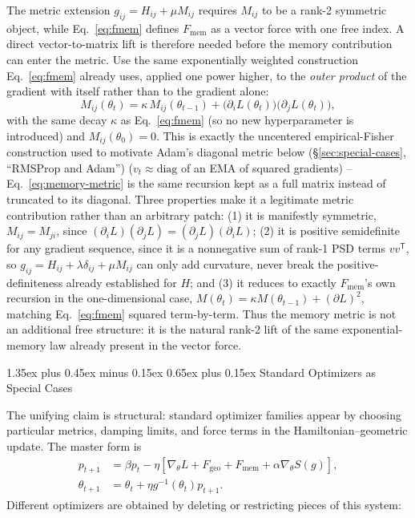 \documentclass[10pt,twocolumn]{article}
\makeatletter
\renewcommand\section{\@startsection{section}{1}{0pt}%
  {1.35ex plus 0.45ex minus 0.15ex}%
  {0.65ex plus 0.15ex}%
  {\large\bfseries}}
\makeatother
\begin{document}
The metric extension $g_{ij} = H_{ij} + \mu M_{ij}$ requires $M_{ij}$ to be a
rank-2 symmetric object, while Eq.~\eqref{eq:fmem} defines
$F_{\mathrm{mem}}$ as a vector force with one free index. A direct
vector-to-matrix lift is therefore needed before the memory contribution can
enter the metric.
Use the same exponentially weighted construction Eq.~\eqref{eq:fmem} already
uses, applied one power higher, to the
\emph{outer product} of the gradient with itself rather than to the gradient
alone:
\begin{equation}
M_{ij}(\theta_t) = \kappa\, M_{ij}(\theta_{t-1}) + \big(\partial_i L(\theta_t)\big)\big(\partial_j L(\theta_t)\big),
\label{eq:memory-metric}
\end{equation}
with the same decay $\kappa$ as Eq.~\eqref{eq:fmem} (so no new hyperparameter
is introduced) and $M_{ij}(\theta_0) = 0$. This is exactly the
uncentered empirical-Fisher construction used to motivate Adam's diagonal
metric below (\S\ref{sec:special-cases},
``RMSProp and Adam'') ($v_t \approx
\mathrm{diag}$ of an EMA of squared gradients) -- Eq.~\eqref{eq:memory-metric}
is the same recursion kept as a full matrix instead of truncated to its
diagonal. Three properties make it a legitimate metric contribution rather
than an arbitrary patch: (1) it is manifestly symmetric,
$M_{ij}=M_{ji}$, since $(\partial_i L)(\partial_j L) = (\partial_j
L)(\partial_i L)$; (2) it is positive semidefinite for any gradient sequence,
since it is a nonnegative sum of rank-1 PSD terms $vv^{\mathsf T}$, so
$g_{ij}=H_{ij}+\lambda\delta_{ij}+\mu M_{ij}$ can only add curvature, never
break the positive-definiteness already established for $H$; and (3) it
reduces to exactly $F_{\mathrm{mem}}$'s own recursion in the one-dimensional
case, $M(\theta_t) = \kappa M(\theta_{t-1}) + (\partial L)^2$, matching
Eq.~\eqref{eq:fmem} squared term-by-term. Thus the memory metric is not an
additional free structure: it is the natural rank-2 lift of the same
exponential-memory law already present in the vector force.

\section{Standard Optimizers as Special Cases}
\label{sec:special-cases}

The unifying claim is structural: standard optimizer families appear by
choosing particular metrics, damping limits, and force terms in the
Hamiltonian--geometric update. The master form is
\begin{align}
p_{t+1} &= \beta p_t - \eta\left[\nabla_\theta L
  + F_{\mathrm{geo}} + F_{\mathrm{mem}} + \alpha\nabla_\theta S(g)\right],\\
\theta_{t+1} &= \theta_t + \eta g^{-1}(\theta_t)p_{t+1}.
\end{align}
Different optimizers are obtained by deleting or restricting pieces of this
system:
\end{document}
